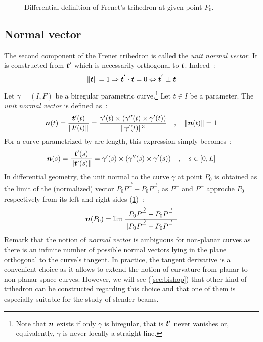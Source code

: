 \begin{figure}[t]
     \centering
     \caption{Differential definition of Frenet's trihedron at given point $P_0$.}
     \label{fig:3_1}
\end{figure}

\subsection{Normal vector}
The second component of the Frenet trihedron is called the \emph{unit normal vector}. It is constructed from $\boldsymbol{t'}$ which is necessarily orthogonal to $\boldsymbol{t}$. Indeed~:
\begin{equation}
	\lVert\boldsymbol{t}\rVert=1 \Rightarrow \boldsymbol{t^{'}} \cdot  \boldsymbol{t} = 0 \Leftrightarrow  \boldsymbol{t^{'}} \perp \boldsymbol{t}
\end{equation}
Let $\gamma = (I,F)$ be a biregular parametric curve.\footnote{Note that $\boldsymbol{n}$ exists if only $\gamma$ is biregular, that is $\boldsymbol{t}'$ never vanishes or, equivalently, $\gamma$ is never locally a straight line.} Let $t \in I$ be a parameter. The \emph{unit normal vector} is defined as~:
\begin{equation}
	\boldsymbol{n}(t) = \frac{\boldsymbol{t}'(t)}{\lVert\boldsymbol{t}'(t)\rVert} 
	= \frac{\gamma'(t) \times (\gamma''(t) \times \gamma'(t))}{\lVert\gamma'(t)\rVert^3}
	\quad,\quad
	\lVert\boldsymbol{n}(t)\rVert=1
\end{equation}
For a curve parametrized by arc length, this expression simply becomes~:
\begin{equation}
	\boldsymbol{n}(s) = \frac{\boldsymbol{t}'(s)}{\lVert\boldsymbol{t}'(s)\rVert} 
	= \gamma'(s) \times (\gamma''(s) \times \gamma'(s))
	\quad,\quad
	s \in [0,L]
\end{equation}
In differential geometry, the unit normal to the curve $\gamma$ at point $P_0$ is obtained as the limit of the (normalized) vector $\overrightarrow{P_0 P^+}-\overrightarrow{P_0 P^-}$, as $P^-$ and $P^+$ approche $P_0$ respectively from its left and right sides (\cref{fig:3_1})~:
\begin{equation}
	\boldsymbol{n}(P_0)
	= \lim_{}\frac{\overrightarrow{P_0 P^+}-\overrightarrow{P_0 P^-}}{\lVert\overrightarrow{P_0 P^+}-\overrightarrow{P_0 P^-}\rVert}
\label{eq:3_4}
\end{equation}
Remark that the notion of \emph{normal vector} is ambiguous for non-planar curves as there is an infinite number of possible normal vectors lying in the plane orthogonal to the curve's tangent. In practice, the tangent derivative is a convenient choice as it allows to extend the notion of curvature from planar to non-planar space curves. However, we will see (\cref{sec:bishop}) that other kind of trihedron can be constructed regarding this choice and that one of them is especially suitable for the study of slender beams.

